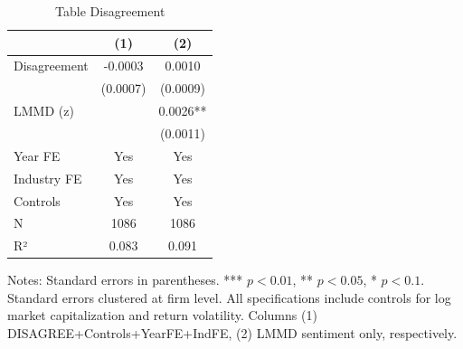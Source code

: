 \begin{table}[htbp]
\centering
\caption{Table Disagreement}
\label{tab:table_disagreement}
\begin{tabular}{lcc}
\toprule
 & (1) & (2) \\
\midrule
Disagreement & -0.0003 & 0.0010 \\
  & (0.0007) & (0.0009) \\
LMMD (z) &  & 0.0026** \\
  &  & (0.0011) \\
\midrule
Year FE & Yes & Yes \\
Industry FE & Yes & Yes \\
Controls & Yes & Yes \\
N & 1086 & 1086 \\
R² & 0.083 & 0.091 \\
\bottomrule
\end{tabular}\begin{flushleft}
\footnotesize Notes: Standard errors in parentheses. *** $p<0.01$, ** $p<0.05$, * $p<0.1$. Standard errors clustered at firm level. All specifications include controls for log market capitalization and return volatility. Columns (1) DISAGREE+Controls+YearFE+IndFE, (2) LMMD sentiment only, respectively.
\end{flushleft}
\end{table}